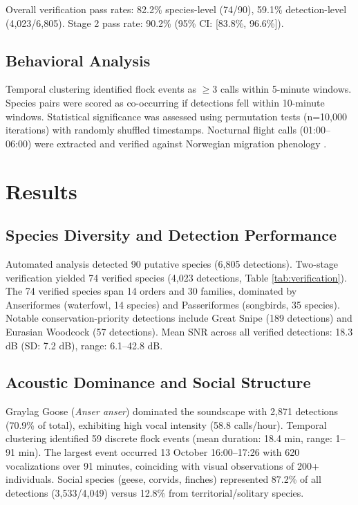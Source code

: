 \documentclass[english,twocolumn]{article}
\begin{document}
Overall verification pass rates: 82.2\% species-level (74/90), 59.1\% detection-level (4,023/6,805). Stage 2 pass rate: 90.2\% (95\% CI: [83.8\%, 96.6\%]).

\subsection{Behavioral Analysis}

Temporal clustering identified flock events as $\geq$3 calls within 5-minute windows. Species pairs were scored as co-occurring if detections fell within 10-minute windows. Statistical significance was assessed using permutation tests (n=10,000 iterations) with randomly shuffled timestamps. Nocturnal flight calls (01:00--06:00) were extracted and verified against Norwegian migration phenology \citep{Shimmings2016}.

\section{Results}

\subsection{Species Diversity and Detection Performance}

Automated analysis detected 90 putative species (6,805 detections). Two-stage verification yielded 74 verified species (4,023 detections, Table \ref{tab:verification}). The 74 verified species span 14 orders and 30 families, dominated by Anseriformes (waterfowl, 14 species) and Passeriformes (songbirds, 35 species). Notable conservation-priority detections include Great Snipe (189 detections) and Eurasian Woodcock (57 detections). Mean SNR across all verified detections: 18.3 dB (SD: 7.2 dB), range: 6.1--42.8 dB.

\subsection{Acoustic Dominance and Social Structure}

Graylag Goose (\textit{Anser anser}) dominated the soundscape with 2,871 detections (70.9\% of total), exhibiting high vocal intensity (58.8 calls/hour). Temporal clustering identified 59 discrete flock events (mean duration: 18.4 min, range: 1--91 min). The largest event occurred 13 October 16:00--17:26 with 620 vocalizations over 91 minutes, coinciding with visual observations of 200+ individuals. Social species (geese, corvids, finches) represented 87.2\% of all detections (3,533/4,049) versus 12.8\% from territorial/solitary species.
\end{document}
